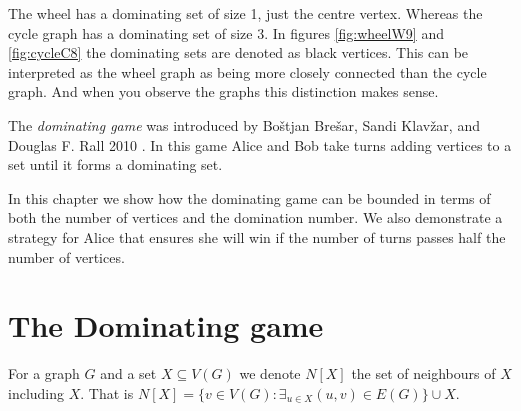 The wheel has a dominating set of size 1, just the centre vertex. Whereas the cycle graph has a dominating set of size 3. In figures  \ref{fig:wheelW9} and \ref{fig:cycleC8} the dominating sets are denoted as black vertices. This can be interpreted as the wheel graph as being more closely connected than the cycle graph. And when you observe the graphs this distinction makes sense.

%
%


The \textit{dominating game} was introduced by Bo\v{s}tjan Bre\v{s}ar, Sandi Klav\v{z}ar, and Douglas F. Rall 2010 \cite{BrKlRa2010}. In this game Alice and Bob take turns adding vertices to a set until it forms a dominating set.

In this chapter we show how the dominating game can be bounded in terms of both the number of vertices and the domination number. We also demonstrate a strategy for Alice that ensures she will win if the number of turns passes half the number of vertices.

\section{The Dominating game}\label{sec:dominating_game}

For a graph $G$ and a set $X\subseteq V(G)$ we denote $N[X]$ the set of neighbours of $X$ including $X$. That is $N[X] = \{v\in V(G) : \exists_{u\in X} (u,v)\in E(G)\}\cup X$. 

